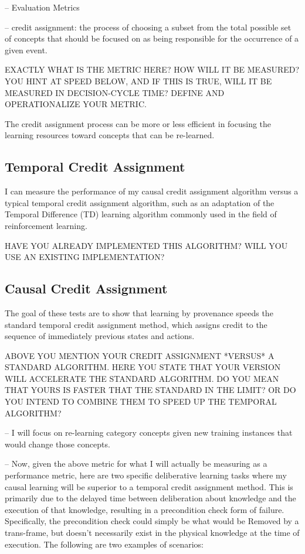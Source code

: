 \documentclass[twoside,letterpaper,11pt]{article}
\begin{document}
  -- Evaluation Metrics

     -- credit assignment: the process of choosing a subset from the
                           total possible set of concepts that should
                           be focused on as being responsible for the
                           occurrence of a given event.

EXACTLY WHAT IS THE METRIC HERE? HOW WILL IT BE MEASURED? YOU HINT AT SPEED BELOW, AND IF THIS IS TRUE, WILL IT BE MEASURED IN DECISION-CYCLE TIME? DEFINE AND OPERATIONALIZE YOUR METRIC.

       The credit assignment process can be more or less efficient in
       focusing the learning resources toward concepts that can be
       re-learned.

\subsection{Temporal Credit Assignment}

       I can measure the performance of my causal credit assignment
       algorithm versus a typical temporal credit assignment
       algorithm, such as an adaptation of the Temporal Difference
       (TD) learning algorithm commonly used in the field of
       reinforcement learning.

HAVE YOU ALREADY IMPLEMENTED THIS ALGORITHM? WILL YOU USE AN EXISTING IMPLEMENTATION?

\subsection{Causal Credit Assignment}

        The goal of these tests are to show that learning by
        provenance speeds the standard temporal credit assignment
        method, which assigns credit to the sequence of immediately
        previous states and actions.

ABOVE YOU MENTION YOUR CREDIT ASSIGNMENT *VERSUS* A STANDARD ALGORITHM. HERE YOU STATE THAT YOUR VERSION WILL ACCELERATE THE STANDARD ALGORITHM. DO YOU MEAN THAT YOURS IS FASTER THAT THE STANDARD IN THE LIMIT? OR DO YOU INTEND TO COMBINE THEM TO SPEED UP THE TEMPORAL ALGORITHM? 

     -- I will focus on re-learning category concepts given new
        training instances that would change those concepts.

  -- Now, given the above metric for what I will actually be measuring
     as a performance metric, here are two specific deliberative
     learning tasks where my causal learning will be superior to a
     temporal credit assignment method.  This is primarily due to the
     delayed time between deliberation about knowledge and the
     execution of that knowledge, resulting in a precondition check
     form of failure.  Specifically, the precondition check could
     simply be what would be Removed by a trans-frame, but doesn't
     necessarily exist in the physical knowledge at the time of
     execution.  The following are two examples of scenarios:
\end{document}
